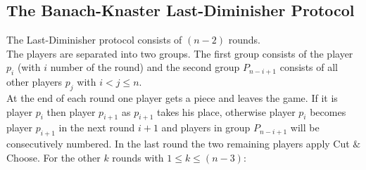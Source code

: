 \subsection{The Banach-Knaster Last-Diminisher Protocol}
The Last-Diminisher protocol consists of $(n-2)$ rounds.\\The players are separated into two groups. The first group consists of the player $p_i$ (with $i$ number of the round) and the second group $P_{n-i+1}$ consists of all other players $p_j$ with $i <j\leq n$.\\ At the end of each round one player gets a piece and leaves the game. If it is player $p_i$ then player $p_{i+1}$ as $p_{i+1}$ takes his place, otherwise player $p_i$ becomes player $p_{i+1}$ in the next round $i+1$ and players in group $P_{n-i+1}$ will be consecutively numbered. In the last round the two remaining players apply Cut $\&$ Choose. For the other $k$ rounds with $1 \leq k \leq (n-3)$:

